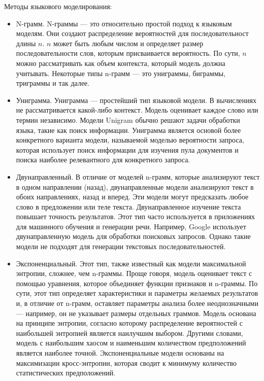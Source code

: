 Методы языкового моделирования:
\begin{itemize}
	\item N-грамм. N-граммы — это относительно простой подход к языковым моделям. Они создают распределение вероятностей для последовательност длины $n$. $n$ может быть любым числом и определяет размер последовательности слов, которым присваивается вероятность. По сути, $n$ можно рассматривать как объем контекста, который модель должна учитывать. Некоторые типы n-грамм — это униграммы, биграммы, триграммы и так далее.
	
	\item Униграмма. Униграмма — простейший тип языковой модели. В вычислениях не рассматривается какой-либо контекст. Модель оценивает каждое слово или термин независимо. Модели Unigram обычно решают задачи обработки языка, такие как поиск информации. Униграмма является основой более конкретного варианта модели, называемой моделью вероятности запроса, которая использует поиск информации для изучения пула документов и поиска наиболее релевантного для конкретного запроса.
	
	\item Двунаправленный. В отличие от моделей n-грамм, которые анализируют текст в одном направлении (назад), двунаправленные модели анализируют текст в обоих направлениях, назад и вперед. Эти модели могут предсказать любое слово в предложении или теле текста. Двунаправленное изучение текста повышает точность результатов. Этот тип часто используется в приложениях для машинного обучения и генерации речи. Например, Google использует двунаправленную модель для обработки поисковых запросов. Однако такие модели не подходят для генерации текстовых последовательностей.
	
	\item Экспоненциальный. Этот тип, также известный как модели максимальной энтропии, сложнее, чем n-граммы. Проще говоря, модель оценивает текст с помощью уравнения, которое объединяет функции признаков и n-граммы. По сути, этот тип определяет характеристики и параметры желаемых результатов и, в отличие от n-грамм, оставляет параметры анализа более неоднозначными — например, он не указывает размеры отдельных граммов. Модель основана на принципе энтропии, согласно которому распределение вероятностей с наибольшей энтропией является наилучшим выбором. Другими словами, модель с наибольшим хаосом и наименьшим количеством предположений является наиболее точной. Экспоненциальные модели основаны на максимизации кросс-энтропии, которая сводит к минимуму количество статистических предположений.
	

\end{itemize}
